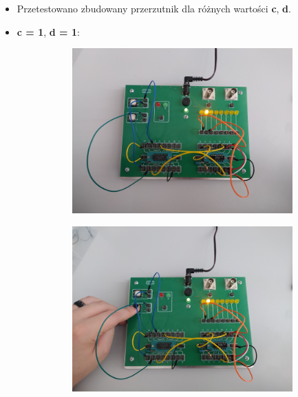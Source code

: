 \begin{itemize}
    \item Przetestowano zbudowany przerzutnik dla różnych wartości \textbf{c}, \textbf{d}.
    \item \textbf{c = 1}, \textbf{d = 1}:
        \begin{figure}[H]
            \centering
            \begin{subfigure}[H]{0.4\textwidth}
                \includegraphics[width=\textwidth]{img/synch_RS/1653500525439_scaled.png}
            \end{subfigure}
            \begin{subfigure}[H]{0.4\textwidth}
                \includegraphics[width=\textwidth]{img/synch_RS/1653500525417_scaled.png}

\end{subfigure}
\end{figure}
\end{itemize}
